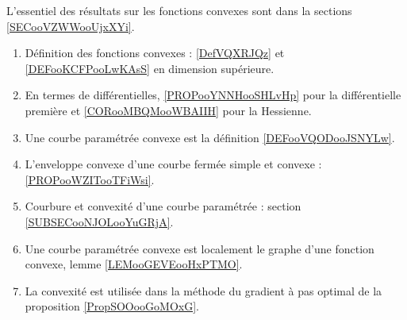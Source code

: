 
L'essentiel des résultats sur les fonctions convexes sont dans la sections \ref{SECooVZWWooUjxXYi}.

\begin{enumerate}
    \item
        Définition des fonctions convexes : \ref{DefVQXRJQz} et \ref{DEFooKCFPooLwKAsS} en dimension supérieure.
    \item 
        En termes de différentielles, \ref{PROPooYNNHooSHLvHp} pour la différentielle première et \ref{CORooMBQMooWBAIIH} pour la Hessienne.
    \item
        Une courbe paramétrée convexe est la définition \ref{DEFooVQODooJSNYLw}.
    \item
        L'enveloppe convexe d'une courbe fermée simple et convexe : \ref{PROPooWZITooTFiWsi}.
    \item 
        Courbure et convexité d'une courbe paramétrée : section \ref{SUBSECooNJOLooYuGRjA}.
    \item
        Une courbe paramétrée convexe est localement le graphe d'une fonction convexe, lemme \ref{LEMooGEVEooHxPTMO}.
    \item
        La convexité est utilisée dans la méthode du gradient à pas optimal de la proposition \ref{PropSOOooGoMOxG}.
\end{enumerate}

